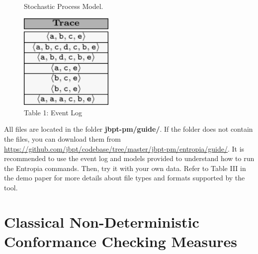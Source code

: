 \documentclass{article}
\begin{document}
\begin{figure}[h!]
\begin{minipage}{0.45\textwidth}
\begin{center}
\vspace{3.5mm}
\caption{Stochastic Process Model.}
\label{fig:SDFA}
\vspace{-10mm}
\end{center}
\end{minipage}

\begin{center}
\vspace{5mm}
\begin{minipage}{0.45\textwidth}
\centering
\includegraphics[width=0.40\textwidth]{fig/eventLog.pdf} 
\caption*{ Table 1: Event Log}
\label{fig:Log}
\end{minipage}
\end{center}
\vspace{-4mm}
\end{figure}

All files are located in the folder \textbf{jbpt-pm\slash guide\slash}. If the folder does not contain the files, you can download them from \url{https://github.com/jbpt/codebase/tree/master/jbpt-pm/entropia/guide/}. It is recommended to use the event log and models provided to understand how to run the Entropia commands. Then, try it with your own data. Refer to Table III in the demo paper for more details about file types and formats supported by the tool.

\section*{Classical Non-Deterministic Conformance Checking Measures}
\setcounter{subsection}{0}
\end{document}

